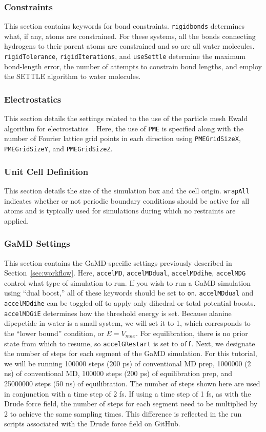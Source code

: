 \documentclass[9pt,tutorial]{livecoms}
\begin{document}
\subsubsection{Constraints}
This section contains keywords for bond constraints. \texttt{rigidbonds} determines what, if any, atoms are constrained. For these systems, all the bonds connecting hydrogens to their parent atoms are constrained and so are all water molecules. \texttt{rigidTolerance}, \texttt{rigidIterations}, and \texttt{useSettle} determine the maximum bond-length error, the number of attempts to constrain bond lengths, and employ the SETTLE algorithm to water molecules.

\subsubsection{Electrostatics}
This section details the settings related to the use of the particle mesh Ewald algorithm for electrostatics~\cite{darden_pme_1993}. Here, the use of  \texttt{PME} is specified along with the number of Fourier lattice grid points in each direction using \texttt{PMEGridSizeX}, \texttt{PMEGridSizeY}, and \texttt{PMEGridSizeZ}.

\subsubsection{Unit Cell Definition}
This section details the size of the simulation box and the cell origin. \texttt{wrapAll} indicates whether or not periodic boundary conditions should be active for all atoms and is typically used for simulations during which no restraints are applied. 

\subsubsection{GaMD Settings}
This section contains the GaMD-specific settings previously described in Section~\ref{sec:workflow}. Here, \texttt{accelMD}, \texttt{accelMDdual}, \texttt{accelMDdihe}, \texttt{accelMDG} control what type of simulation to run. If you wish to run a GaMD simulation using ``dual boost,'' all of these keywords should be set to \texttt{on}. \texttt{accelMDdual} and \texttt{accelMDdihe} can be toggled off to apply only dihedral or total potential boosts. \texttt{accelMDGiE} determines how the threshold energy is set. Because alanine dipepetide in water is a small system, we will set it to 1, which corresponds to the ``lower bound'' condition, or $E=V_{max}$. For equilibration, there is no prior state from which to resume, so \texttt{accelGRestart} is set to \texttt{off}. Next, we designate the number of steps for each segment of the GaMD simulation. For this tutorial, we will be running 100000 steps (200 ps) of conventional MD prep, 1000000 (2 ns) of conventional MD, 100000 steps (200 ps) of equilibration prep, and 25000000 steps (50 ns) of equilibration. The number of steps shown here are used in conjunction with a time step of 2 fs. If using a time step of 1 fs, as with the Drude force field, the number of steps for each segment need to be multiplied by 2 to achieve the same sampling times. This difference is reflected in the run scripts associated with the Drude force field on GitHub.
\end{document}
